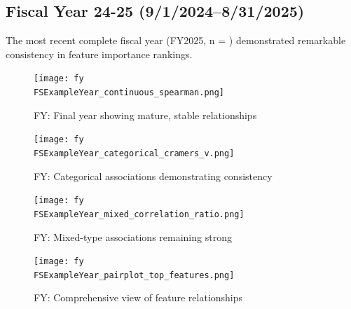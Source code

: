 \newpage

\subsection{Fiscal Year 24-25 (9/1/2024--8/31/2025)}

The most recent complete fiscal year (FY2025, n = \FSRecordsFinalFYTwoThousandTwentyFive) demonstrated remarkable consistency in feature importance rankings.

\vspace*{\fill}
\begin{figure}[htbp]
\centering
\texttt{[image: fy\\FSExampleYear\_continuous\_spearman.png]}
\caption{FY\FSExampleYear: Final year showing mature, stable relationships}
\label{fig:spearman-2025}
\end{figure}
\vspace*{\fill}

\newpage

\vspace*{\fill}
\begin{figure}[htbp]
\centering
\texttt{[image: fy\\FSExampleYear\_categorical\_cramers\_v.png]}
\caption{FY\FSExampleYear: Categorical associations demonstrating consistency}
\label{fig:cramers-2025}
\end{figure}
\vspace*{\fill}

\newpage

\vspace*{\fill}
\begin{figure}[htbp]
\centering
\texttt{[image: fy\\FSExampleYear\_mixed\_correlation\_ratio.png]}
\caption{FY\FSExampleYear: Mixed-type associations remaining strong}
\label{fig:eta-2025}
\end{figure}
\vspace*{\fill}

\newpage

\vspace*{\fill}
\begin{figure}[htbp]
\centering
\texttt{[image: fy\\FSExampleYear\_pairplot\_top\_features.png]}
\caption{FY\FSExampleYear: Comprehensive view of feature relationships}
\label{fig:pairplot-2025}
\end{figure}
\vspace*{\fill}

\newpage

